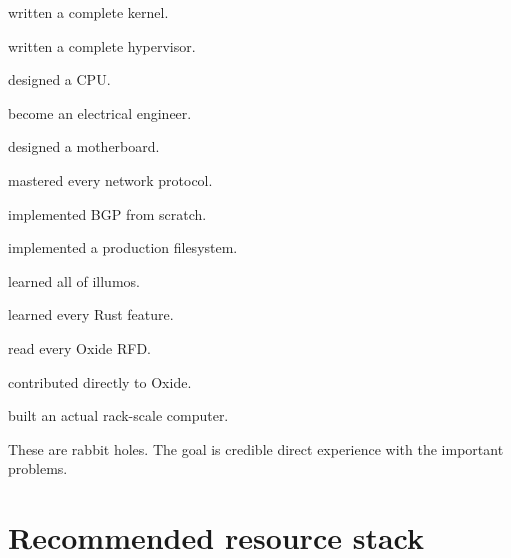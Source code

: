 \documentclass[11pt,letterpaper]{article}
\begin{document}
\begin{topics}

\item written a complete kernel.

\item written a complete hypervisor.

\item designed a CPU.

\item become an electrical engineer.

\item designed a motherboard.

\item mastered every network protocol.

\item implemented BGP from scratch.

\item implemented a production filesystem.

\item learned all of illumos.

\item learned every Rust feature.

\item read every Oxide RFD.

\item contributed directly to Oxide.

\item built an actual rack-scale computer.

\end{topics}

These are rabbit holes. The goal is credible direct experience with the important problems.

\section{Recommended resource stack}\label{sec:25}
\end{document}
